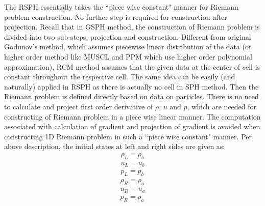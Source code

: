 The RSPH essentially takes the ``piece wise constant" manner for Riemann problem construction. No further step is required for construction after projection. Recall that in GSPH method, the construction of Riemann problem is divided into two sub-steps: projection and construction. 
Different from original Godunov's method, which assumes piecewise linear distribution of the data (or higher order method like MUSCL and PPM which use higher order polynomial approximation), RCM method assumes that the given data at the center of cell is constant throughout the respective cell. The same idea can be easily (and naturally) applied in RSPH as there is actually no cell in SPH method. Then the Riemann problem is defined directly based on data on particles. There is no need to calculate and project first order derivative of $\rho$, $u$ and $p$, which are needed for constructing of Riemann problem in a piece wise linear manner. The computation associated with calculation of gradient and projection of gradient is avoided when constructing 1D Riemann problem in such a ``piece wise constant" manner.
Per above description, the initial states at left and right sides are given as: 
\begin{eqnarray}
\rho_L = \rho_b 
\label{eq:Riemann-Prob-define-L-rho} \\
u_L = u_b 
\label{eq:Riemann-Prob-define-L-v} \\
p_L = p_b 
\label{eq:Riemann-Prob-define-L-p}
\end{eqnarray}
\begin{eqnarray}
\rho_R = \rho_a 
\label{eq:Riemann-Prob-define-R-rho} \\
u_R = u_a 
\label{eq:Riemann-Prob-define-R-v} \\
p_R = p_a 
\label{eq:Riemann-Prob-define-R-p}
\end{eqnarray}

